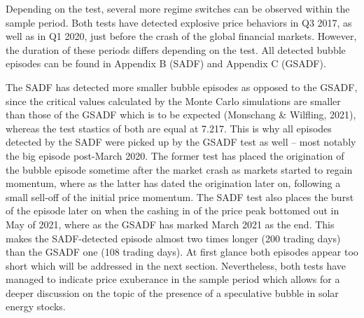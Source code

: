 \documentclass[11pt]{article}
\begin{document}
Depending on the test, several more regime switches can be observed within the sample period. Both tests have detected explosive price behaviors in Q3 2017, as well as in Q1 2020, just before the crash of the global financial markets. However, the duration of these periods differs depending on the test. All detected bubble episodes can be found in Appendix B (SADF) and Appendix C (GSADF).
\newline

The SADF has detected more smaller bubble episodes as opposed to the GSADF, since the critical values calculated by the Monte Carlo simulations are smaller than those of the GSADF which is to be expected (Monschang \& Wilfling, 2021), whereas the test stastics of both are equal at 7.217. This is why all episodes detected by the SADF were picked up by the GSADF test as well -- most notably the big episode post-March 2020. The former test has placed the origination of the bubble episode sometime after the market crash as markets started to regain momentum, where as the latter has dated the origination later on, following a small sell-off of the initial price momentum. The SADF test also places the burst of the episode later on when the cashing in of the price peak bottomed out in May of 2021, where as the GSADF has marked March 2021 as the end. This makes the SADF-detected episode almost two times longer (200 trading days) than the GSADF one (108 trading days). At first glance both episodes appear too short which will be addressed in the next section. Nevertheless, both tests have managed to indicate price exuberance in the sample period which allows for a deeper discussion on the topic of the presence of a speculative bubble in solar energy stocks.
\newpage
\end{document}
